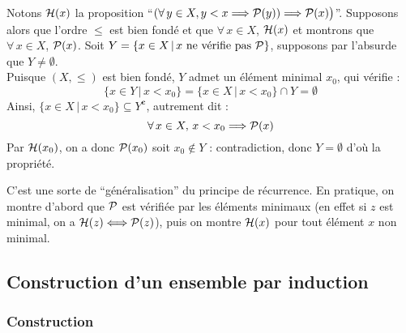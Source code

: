 		\eqskip{2mm}
		\begin{Preuve}
			Notons \(\cal{H}(x)\) la proposition ``\((\forall \,y \in X, y < x \Longrightarrow \cal{P}(y)) \Longrightarrow \cal{P}(x)\big)\)''. Supposons alors que l'ordre \(\leqslant\) est bien fondé et que \(\forall\,x\in X\), \(\cal{H}(x)\) et montrons que \(\forall\,x\in X\), \(\cal{P}(x)\). \nt
			Soit \(Y = \{x\in X \,|\, x \text{ ne vérifie pas } \cal{P}\}\), supposons par l'absurde que \(Y \neq \emptyset\). \\
			Puisque \((X,\leqslant)\) est bien fondé, \(Y\) admet un élément minimal \(x_0\), qui vérifie :
				\[\{x \in Y \,|\, x < x_0\} = \{x \in X \,|\, x < x_0\} \cap Y = \emptyset\]
			Ainsi, \(\{x \in X\,|\,x < x_0\} \subseteq Y^{\bm{c}}\), autrement dit :
				\[\forall \,x \in X,\, x < x_0 \Longrightarrow \cal{P}(x)\]
			Par \(\cal{H}(x_0)\), on a donc \(\cal{P}(x_0)\) soit \(x_0 \notin Y\) : contradiction, donc \(Y = \emptyset\) d'où la propriété.
		\end{Preuve}
		
		\begin{Remarque}
			C'est une sorte de ``généralisation'' du principe de récurrence. En pratique, on montre d'abord que \(\cal{P}\) est vérifiée par les éléments minimaux (en effet si \(z\) est minimal, on a \(\cal{H}(z) \iff \cal{P}(z)\)), puis on montre \(\cal{H}(x)\) pour tout élément \(x\) non minimal.
		\end{Remarque}
		
		
	\subsection{Construction d'un ensemble par induction}
		
		\subsubsection{Construction}
			
